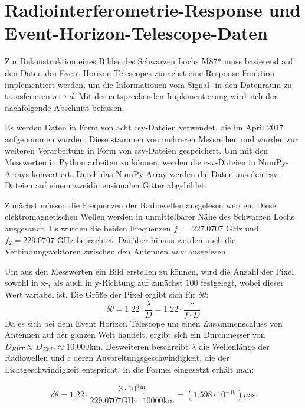 \section{Radiointerferometrie-Response und Event-Horizon-Telescope-Daten}

Zur Rekonstruktion eines Bildes des Schwarzen Lochs M87* muss basierend auf den Daten des Event-Horizon-Telescopes zunächst eine Response-Funktion implementiert werden, um die Informationen vom Signal- in den Datenraum zu transferieren $s \mapsto d$. Mit der entsprechenden Implementierung wird sich der nachfolgende Abschnitt befassen.

Es werden Daten in Form von acht csv-Dateien verwendet, die im April 2017 aufgenommen wurden. Diese stammen von mehreren Messreihen und wurden zur weiteren Verarbeitung in Form von csv-Dateien gespeichert.
Um mit den Messwerten in Python arbeiten zu können, werden die csv-Dateien in NumPy-Arrays konvertiert. Durch das NumPy-Array werden die Daten aus den csv-Dateien auf einem zweidimensionalen Gitter abgebildet.

Zunächst müssen die Frequenzen der Radiowellen ausgelesen werden. Diese elektromagnetischen Wellen werden in unmittelbarer Nähe des Schwarzen Lochs ausgesandt. Es wurden die beiden Frequenzen $f_1 = 227.0707$ GHz und $f_2 = 229.0707$ GHz betrachtet. Darüber hinaus werden auch die Verbindungsvektoren zwischen den Antennen $uvw$ ausgelesen.

Um aus den Messwerten ein Bild erstellen zu können, wird die Anzahl der Pixel sowohl in x-, als auch in y-Richtung auf zunächst $100$ festgelegt, wobei dieser Wert variabel ist. Die Größe der Pixel ergibt sich für $\delta \theta$:
\begin{equation}
\delta \theta = 1.22 \cdot \displaystyle\frac{\lambda}{D} = 1.22 \cdot \displaystyle\frac{c}{f \cdot D}
\end{equation}
Da es sich bei dem Event Horizon Telescope um einen Zusammenschluss von Antennen auf der ganzen Welt handelt, ergibt sich ein Durchmesser von $D_{EHT} \approx D_{Erde} \approx 10.000\text{km}$. Desweiteren beschreibt $\lambda$ die Wellenlänge der Radiowellen und $c$ deren Ausbreitungsgeschwindigkeit, die der Lichtgeschwindigkeit entspricht. In die Formel eingesetzt erhält man:

\begin{equation}
  \delta \theta = 1.22 \cdot \displaystyle\frac{3 \cdot 10^{8} \displaystyle\frac{\text{m}}{\text{s}}} {229.0707 \text{GHz} \cdot 10000 \text{km}} = (1.598 \cdot 10^{-10}) \mu \text{as} 
\end{equation}

